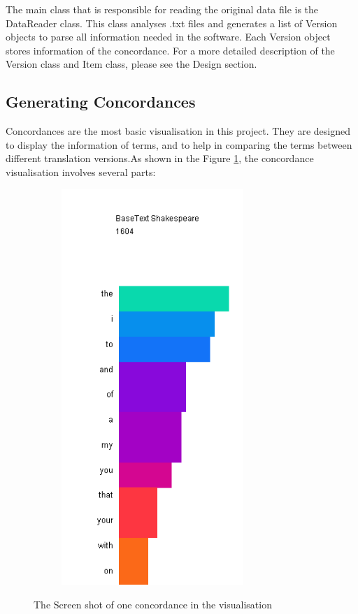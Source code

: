 The main class that is responsible for reading the original data file is the DataReader class. This class analyses .txt files and generates a list of Version objects to parse all information needed in the software. Each Version object stores information of the concordance. For a more detailed description of the Version class and Item class, please see the Design section.

\subsection{Generating Concordances}

Concordances are the most basic visualisation in this project. They are designed to display the information of terms, and to help in comparing the terms between different translation versions.As shown in the Figure \ref{fig:condorVis}, the concordance visualisation involves several parts:
\begin{figure}[H]
	\centering	
	\includegraphics[width=9cm, height=15cm]{Figs/condordanceVis}\\[1ex]
	\caption{The Screen shot of one concordance in the visualisation}
	\label{fig:condorVis}
\end{figure} 

